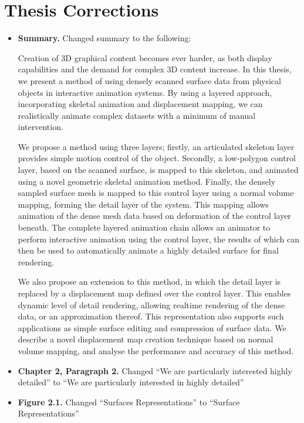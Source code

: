 \documentclass[11pt,a4paper]{book}
\begin{document}

\chapter*{Thesis Corrections}

\begin{itemize}

\item{\bf Summary.}
Changed summary to the following:

Creation of 3D graphical content becomes ever harder, as both display capabilities and the demand for complex 3D content increase. In this thesis, we present a method of using densely scanned surface data from physical objects in interactive animation systems. By using a layered approach, incorporating skeletal animation and displacement mapping, we can realistically animate complex datasets with a minimum of manual intervention. 

We propose a method using three layers; firstly, an articulated skeleton layer provides simple motion control of the object. Secondly, a low-polygon control layer, based on the scanned surface, is mapped to this skeleton, and animated using a novel geometric skeletal animation method. Finally, the densely sampled surface mesh is mapped to this control layer using a normal volume mapping, forming the detail layer of the system. This mapping allows animation of the dense mesh data based on deformation of the control layer beneath. The complete layered animation chain allows an animator to perform interactive animation using the control layer, the results of which can then be used to automatically animate a highly detailed surface for final rendering. 

We also propose an extension to this method, in which the detail layer is replaced by a displacement map defined over the control layer. This enables dynamic level of detail rendering, allowing realtime rendering of the dense data, or an approximation thereof. This representation also supports such applications as simple surface editing and compression of surface data. We describe a novel displacement map creation technique based on normal volume mapping, and analyse the performance and accuracy of this method.

\item{\bf Chapter 2, Paragraph 2.}
Changed ``We are particularly interested highly detailed'' to  ``We are particularly interested in highly detailed''

\item{\bf Figure 2.1.}
Changed ``Surfaces Representations'' to ``Surface Representations''


\end{itemize}
\end{document}
